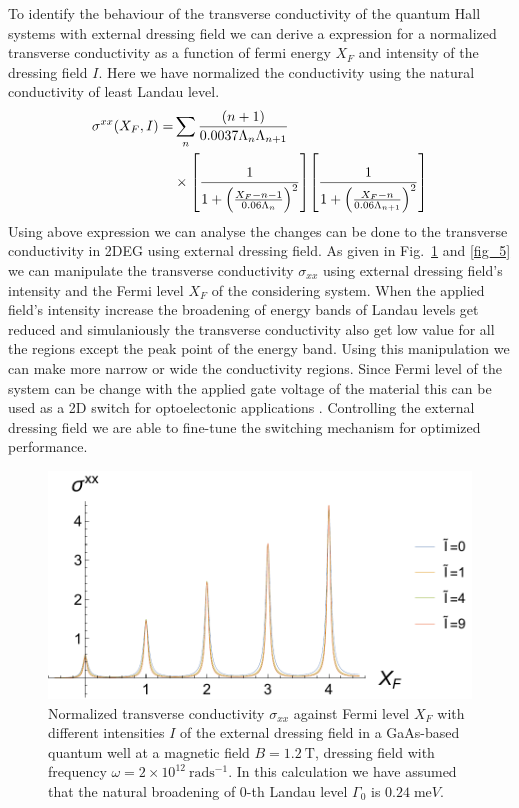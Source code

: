 To identify the behaviour of the transverse conductivity of the quantum Hall systems with external dressing field we can derive a expression for a normalized
transverse conductivity as a function of fermi energy $X_F$ and intensity of the dressing field $I$. Here we have normalized the conductivity using the natural conductivity of least Landau level.
\begin{equation} \label{eq_36}
  \begin{aligned}
    \sigma^{xx}(X_F,I) = &
    \sum_{n}
    \frac{\qty(n+1)}{0.0037\Lambda_n \Lambda_{n+1}} \\
    & \times
    \qty[
      \frac{1}
      {
        1 + \qty(\frac{X_F - n -1}{0.06\Lambda_n})^2
      }
    ]
    \qty[
      \frac{1}
      {
        1 + \qty(\frac{X_F - n}{0.06\Lambda_{n+1}})^2
      }
    ]
  \end{aligned}
\end{equation}
Using above expression we can analyse the changes can be done to the transverse conductivity in 2DEG using external dressing field. As given in Fig.~\ref{fig_4} and \ref{fig_5} we can manipulate the transverse conductivity $\sigma_{xx}$ using external dressing field's intensity and the Fermi level $X_F$ of the considering system. When the applied field's intensity increase the broadening of energy bands of Landau levels get reduced and simulaniously the transverse conductivity also get low value for all the regions except the peak point of the energy band. Using this manipulation we can make more narrow or wide the conductivity regions. Since Fermi level of the system can be change with the applied gate voltage of the material this can be used as a 2D switch for optoelectonic applications \cite{dini16}. Controlling  the external dressing field we are able to fine-tune the switching mechanism for optimized performance.
\begin{figure}[t]
\includegraphics[scale=0.55]{figures/fig_5}
\caption{\label{fig_4} Normalized transverse conductivity $\sigma_{xx}$ against Fermi level $X_F$ with different intensities $I$ of the external dressing field in a GaAs-based quantum well at a magnetic field $B = 1.2~\text{T}$, dressing field with frequency $\omega =2\times10^{12}~\text{rad}\text{s}^{-1}$. In this calculation we have assumed that the natural  broadening of $0$-th Landau level $\Gamma_0$ is $0.24\;\text{me}V$.}
\end{figure}
